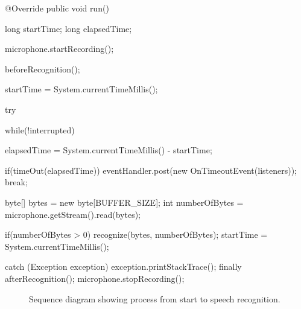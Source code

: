 \begin{program}[hbt!]
    \caption{RecognizerThread's run method.}
    \label{list:recognitionRun}
    \begin{JavaCode}
    @Override
    	public void run() {
    		long startTime;
    		long elapsedTime;
    
    		microphone.startRecording();
    
    		beforeRecognition();
    
    		startTime = System.currentTimeMillis();
    
    		try {
    			while(!interrupted) {	
    				elapsedTime = System.currentTimeMillis() - startTime;
    
    				if(timeOut(elapsedTime)) {
    					eventHandler.post(new OnTimeoutEvent(listeners));
    					break;
    				}		
    
    				byte[] bytes = new byte[BUFFER_SIZE];
    				int numberOfBytes = microphone.getStream().read(bytes);
    
    				if(numberOfBytes > 0) {					
    					recognize(bytes, numberOfBytes);
    					startTime = System.currentTimeMillis();
    				}
    			}
    		} catch (Exception exception) {
    			exception.printStackTrace();
    		} finally {
    			afterRecognition();
    			microphone.stopRecording();	
    		}
    
    	}    \end{JavaCode}
\end{program}

\begin{figure}
    \centering
    \caption{Sequence diagram showing process from start to speech recognition.}
    \label{fig:sequenceRecognition}
\end{figure}

